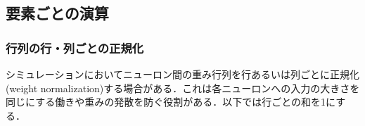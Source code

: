 \subsection{要素ごとの演算}\subsubsection{行列の行・列ごとの正規化}シミュレーションにおいてニューロン間の重み行列を行あるいは列ごとに正規化 (weight normalization)する場合がある．これは各ニューロンへの入力の大きさを同じにする働きや重みの発散を防ぐ役割がある．以下では行ごとの和を1にする．